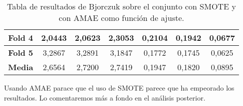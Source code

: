 \begin{table}[H]
{\begin{tabular}{|ccccccc|}
\multicolumn{1}{|c|}{\textbf{Fold 4}}            & \multicolumn{1}{c|}{2,0443}            & \multicolumn{1}{c|}{2,0623}              & \multicolumn{1}{c|}{\textbf{2,3053}} & \multicolumn{1}{c|}{0,2104}            & \multicolumn{1}{c|}{0,1942}              & 0,0677          \\ \hline
\multicolumn{1}{|c|}{\textbf{Fold 5}}            & \multicolumn{1}{c|}{3,2867}            & \multicolumn{1}{c|}{3,2891}              & \multicolumn{1}{c|}{3,1847}          & \multicolumn{1}{c|}{0,1772}            & \multicolumn{1}{c|}{0,1745}              & 0,0625          \\ \hline
\multicolumn{1}{|c|}{\textbf{Media}}             & \multicolumn{1}{c|}{2,6564}           & \multicolumn{1}{c|}{2,7200}             & \multicolumn{1}{c|}{2,7419}          & \multicolumn{1}{c|}{0,1947}           & \multicolumn{1}{c|}{0,1820}             & 0,0895         \\ \hline
\end{tabular}%
}
\caption{Tabla de resultados de Bjorczuk sobre el conjunto con SMOTE y con AMAE como función de ajuste.}\label{tablaBJORCZUKconSMOTEconAMAE}
\end{table}

Usando AMAE parace que el uso de SMOTE parece que ha empeorado los resultados. Lo comentaremos más a fondo en el análisis posterior.

